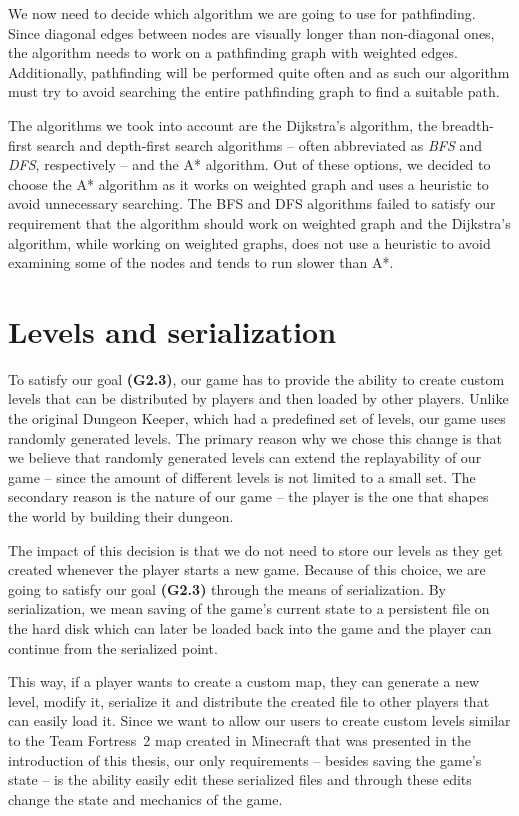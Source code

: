 We now need to decide which algorithm we are going to use for pathfinding. Since diagonal edges between nodes are visually longer than
non-diagonal ones, the algorithm needs to work on a pathfinding graph with weighted edges. Additionally, pathfinding will be performed
quite often and as such our algorithm must try to avoid searching the entire pathfinding graph to find a suitable path.

The algorithms we took into account are the Dijkstra's algorithm, the breadth-first search and depth-first search algorithms 
-- often abbreviated as \emph{BFS} and \emph{DFS}, respectively -- and the A* algorithm. Out of these options, we decided to choose
the A* algorithm as it works on weighted graph and uses a heuristic to avoid unnecessary searching. The BFS and DFS algorithms failed
to satisfy our requirement that the algorithm should work on weighted graph and the Dijkstra's algorithm, while working on weighted
graphs, does not use a heuristic to avoid examining some of the nodes and tends to run slower than A*.

\section{Levels and serialization}

To satisfy our goal \textbf{(G2.3)}, our game has to provide the ability to create custom levels that can be distributed by
players and then loaded by other players. Unlike the original Dungeon Keeper, which had a predefined set of levels, our game uses
randomly generated levels. The primary reason why we chose this change is that we believe that randomly generated levels can extend the
replayability of our game -- since the amount of different levels is not limited to a small set. The secondary reason is the nature of
our game -- the player is the one that shapes the world by building their dungeon.

The impact of this decision is that we do not need to store our levels as they get created whenever the player starts a new game. 
Because of this choice, we are going to satisfy our goal \textbf{(G2.3)} through the means of serialization. By serialization, we mean
saving of the game's current state to a persistent file on the hard disk which can later be loaded back into the game and the player
can continue from the serialized point.

This way, if a player wants to create a custom map, they can generate a new level, modify it, serialize it and distribute the created
file to other players that can easily load it. Since we want to allow our users to create custom levels similar to the Team Fortress~2
map created in Minecraft that was presented in the introduction of this thesis, our only requirements -- besides saving the game's state --
is the ability easily edit these serialized files and through these edits change the state and mechanics of the game.

